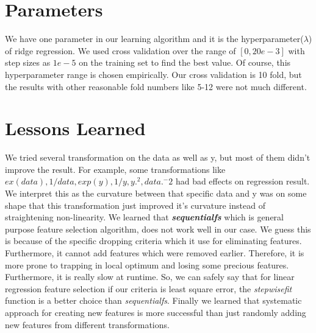 \documentclass[a4paper, 11pt]{article}
\begin{document}
\section{Parameters}
We have one  parameter in our learning algorithm and it is the hyperparameter($\lambda$) of ridge regression. We used cross validation over the range of $[0, 20e-3]$ with step sizes as $1e-5$ on the training set to find the best value. Of course, this hyperparameter range is chosen empirically. Our cross validation is 10 fold, but the results with other reasonable fold numbers like 5-12 were not much different. 


\section{Lessons Learned} 
We tried several transformation on the data as well as y, but most of them didn't improve the result. For example, some transformations like $ex(data), 1/data, exp(y), 1/y, y.^2, data.^-2$ had bad effects on regression result. We interpret this as the curvature between that specific data and y was on some shape that this transformation just improved it's curvature instead of straightening non-linearity. We learned that \textbf{\textit{sequentialfs}} which is general purpose feature selection algorithm, does not work well in our case. We guess this is because of the specific dropping criteria which it use for eliminating features. Furthermore, it cannot add features which were removed earlier. Therefore, it is more prone to trapping in local optimum and losing some precious features. Furthermore, it is really slow at runtime. So, we can safely say that for linear regression feature selection if our criteria is least square error, the \textit{stepwisefit} function is a better choice than \textit{sequentialfs}.  Finally we learned that systematic approach for creating new features is more successful than just randomly adding new features from different transformations.
\end{document}
